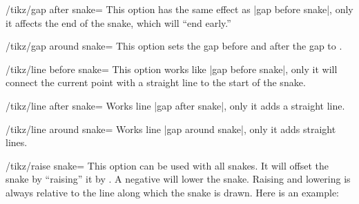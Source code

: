 \begin{key}{/tikz/gap after snake=}
  This option has the same effect as |gap before snake|, only it
  affects the end of the snake, which will ``end early.''
\end{key}
\begin{key}{/tikz/gap around snake=}
  This option sets the gap before and after the gap to
  . 
\begin{codeexample}[]
\end{codeexample}
\end{key}
\begin{key}{/tikz/line before snake=}
  This option works like |gap before snake|, only it will connect the
  current point with a straight line to the start of the snake.
\begin{codeexample}[]
\end{codeexample}
\end{key}
\begin{key}{/tikz/line after snake=}
  Works line |gap after snake|, only it adds a straight line.
\end{key}
\begin{key}{/tikz/line around snake=}
  Works line |gap around snake|, only it adds straight lines.
\end{key}
\begin{key}{/tikz/raise snake=}
  This option can be used with all snakes. It will offset the snake by
  ``raising'' it by . A negative  will
  lower the snake. Raising and lowering is always relative to the line
  along which the snake is drawn. Here is an example:
\begin{codeexample}[]
\end{codeexample}
\end{key}
